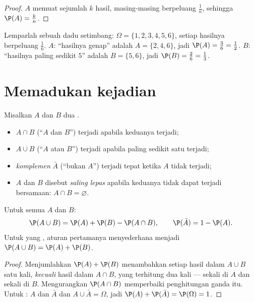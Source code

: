 \begin{proof}
$A$ memuat sejumlah $k$ hasil, masing-masing berpeluang $\frac1n$,
sehingga $\P(A) = \frac kn$.
\end{proof}

\begin{example}\label{ex:g10:proba:die}
Lemparlah sebuah dadu setimbang: $\Omega = \{1, 2, 3, 4, 5, 6\}$, setiap
hasilnya berpeluang $\frac16$.  $A$: ``hasilnya genap'' adalah
$A = \{2, 4, 6\}$, jadi $\P(A) = \frac36 = \frac12$.  $B$: ``hasilnya
paling sedikit $5$'' adalah $B = \{5, 6\}$, jadi $\P(B) = \frac26 =
\frac13$.
\end{example}

\section{Memadukan kejadian}

\begin{definition}\label{def:g10:proba:operations}
Misalkan $A$ dan $B$ dua .
\begin{itemize}
  \item $A \cap B$ (``$A$ dan $B$'') terjadi apabila keduanya terjadi;
  \item $A \cup B$ (``$A$ atau $B$'') terjadi apabila paling sedikit satu terjadi;
  \item \emph{komplemen} $\bar A$ (``bukan $A$'')
        terjadi tepat ketika $A$ tidak terjadi;
  \item $A$ dan $B$ disebut \emph{saling lepas} apabila keduanya tidak dapat terjadi
        bersamaan: $A \cap B = \varnothing$.
\end{itemize}
\end{definition}

\begin{theorem}\label{thm:g10:proba:addition}
Untuk semua  $A$ dan $B$:
\[
\P(A \cup B) = \P(A) + \P(B) - \P(A \cap B),
\qquad
\P(\bar A) = 1 - \P(A) .
\]
Untuk  yang , aturan pertamanya menyederhana menjadi
$\P(A \cup B) = \P(A) + \P(B)$.
\end{theorem}

\begin{proof}
Menjumlahkan $\P(A) + \P(B)$ menambahkan  setiap hasil dalam
$A \cup B$ satu kali, \emph{kecuali} hasil dalam $A \cap B$, yang terhitung
dua kali --- sekali di $A$ dan sekali di $B$. Mengurangkan $\P(A \cap B)$
memperbaiki penghitungan ganda itu. Untuk : $A$ dan $\bar A$  dan $A \cup \bar A = \Omega$, jadi $\P(A) + \P(\bar A) = \P(\Omega) = 1$.
\end{proof}

